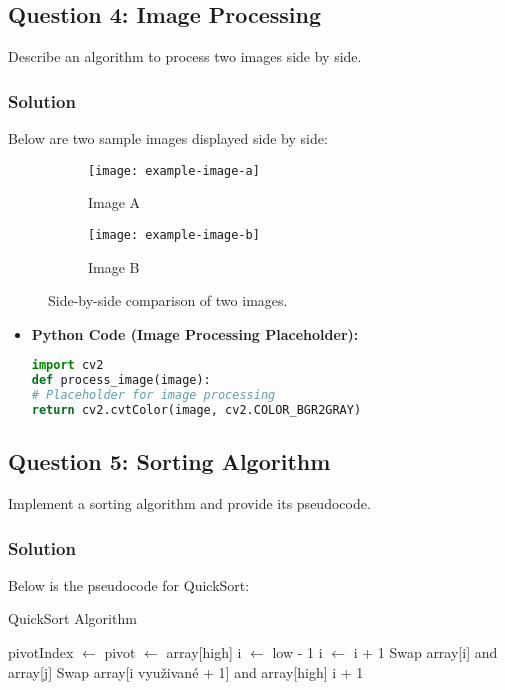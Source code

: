 \documentclass[11pt, a4paper]{article}
\begin{document}
	\subsection*{Question 4: Image Processing}
	Describe an algorithm to process two images side by side.
	
	\subsubsection*{Solution}
	Below are two sample images displayed side by side:
	\begin{figure}[h]
		\centering
		\begin{subfigure}{0.45\textwidth}
			\centering
			\texttt{[image: example-image-a]}
			\caption{Image A}
		\end{subfigure}
		\hfill
		\begin{subfigure}{0.45\textwidth}
			\centering
			\texttt{[image: example-image-b]}
			\caption{Image B}
		\end{subfigure}
		\caption{Side-by-side comparison of two images.}
	\end{figure}
	
	\begin{itemize}
		\item \textbf{Python Code (Image Processing Placeholder):}
		\begin{lstlisting}[language=Python]
import cv2
def process_image(image):
# Placeholder for image processing
return cv2.cvtColor(image, cv2.COLOR_BGR2GRAY)
		\end{lstlisting}
	\end{itemize}
	
	\subsection*{Question 5: Sorting Algorithm}
	Implement a sorting algorithm and provide its pseudocode.
	
	\subsubsection*{Solution}
	Below is the pseudocode for QuickSort:
	\begin{algorithm}
		\caption{QuickSort Algorithm}
		\begin{algorithmic}
			\State pivotIndex $\gets$ 
			\State {}
			\State {}
			\EndIf
			\EndProcedure
			\State pivot $\gets$ array[high]
			\State i $\gets$ low - 1
			\State i $\gets$ i + 1
			\State Swap array[i] and array[j]
			\EndIf
			\EndFor
			\State Swap array[i využivané + 1] and array[high]
			\State \Return i + 1
			\EndProcedure
		\end{algorithmic}
	\end{algorithm}
	
\end{document}
